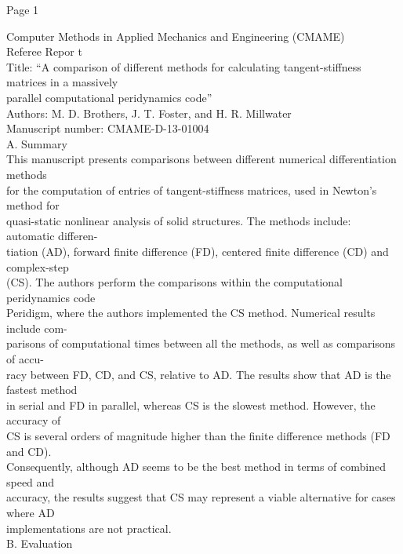 Page 1

Computer Methods in Applied Mechanics and Engineering (CMAME) \\Referee
Repor t \\

Title: ``A comparison of different methods for calculating
tangent-stiffness matrices in a massively \\parallel computational
peridynamics code'' \\

Authors: M. D. Brothers, J. T. Foster, and H. R. Millwater \\

Manuscript number: CMAME-D-13-01004 \\

A. Summary \\

This manuscript presents comparisons between different numerical
differentiation methods \\for the computation of entries of
tangent-stiffness matrices, used in Newton's method for \\quasi-static
nonlinear analysis of solid structures. The methods include: automatic
differen- \\tiation (AD), forward ﬁnite difference (FD), centered ﬁnite
difference (CD) and complex-step \\(CS). The authors perform the
comparisons within the computational peridynamics code \\Peridigm, where
the authors implemented the CS method. Numerical results include com-
\\parisons of computational times between all the methods, as well as
comparisons of accu- \\racy between FD, CD, and CS, relative to AD. The
results show that AD is the fastest method \\in serial and FD in
parallel, whereas CS is the slowest method. However, the accuracy of
\\CS is several orders of magnitude higher than the ﬁnite difference
methods (FD and CD). \\Consequently, although AD seems to be the best
method in terms of combined speed and \\accuracy, the results suggest
that CS may represent a viable alternative for cases where AD
\\implementations are not practical. \\B. Evaluation \\


